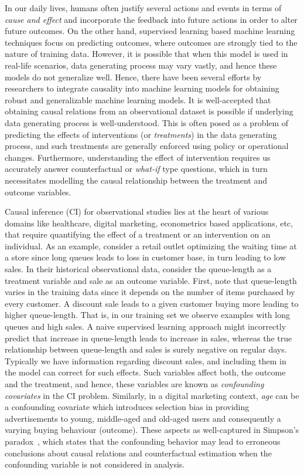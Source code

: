 \documentclass[twoside,11pt]{article}
\begin{document}
In our daily lives, humans often justify several actions and events in terms of \emph{cause and effect} and incorporate the feedback into future actions in order to alter future outcomes. On the other hand, supervised learning based machine learning techniques focus on predicting outcomes, where outcomes are strongly tied to the nature of training data. However, it is possible that when this model is used in real-life scenarios, data generating process may vary vastly, and hence these models do not generalize well. Hence, there have been several efforts by researchers to integrate causality into machine learning models for obtaining robust and generalizable machine learning models. It is well-accepted that obtaining causal relations from an observational dataset is possible if underlying data generating process is well-understood. This is often posed as a problem of predicting the effects of interventions (or \emph{treatments}) in the data generating process, and such treatments are generally enforced using policy or operational changes. Furthermore, understanding the effect of intervention requires us accurately answer counterfactual or \emph{what-if} type questions, which in turn necessitates modelling the  causal relationship between the treatment and outcome variables.

Causal inference (CI) for observational studies lies at the heart of various domains like healthcare, digital marketing, econometrics based applications, etc, that require quantifying the effect of a treatment or an intervention on an individual. As an example, consider a retail outlet optimizing the waiting time at a store since long queues leads to loss in customer base, in turn leading to low sales. In their historical observational data, consider the queue-length as a treatment variable and sale as an outcome variable. First, note that queue-length varies in the training data since it depends on the number of items purchased by every customer. A discount sale leads to a given customer buying more leading to higher queue-length. That is, in our training set we observe examples with long queues and high sales. A naive supervised learning approach might incorrectly predict that increase in queue-length leads to increase in sales, whereas the true relationship between queue-length and sales is surely negative on regular days. Typically we have information regarding discount sales, and including them in the model can correct for such effects. Such variables affect both, the outcome and the treatment, and hence, these variables are known as \emph{confounding covariates} in the CI problem. Similarly, in a digital marketing context, \emph{age} can be a confounding covariate which introduces selection bias in providing advertisements to young, middle-aged and old-aged users and consequently a varying buying behaviour (outcome). These aspects as well-captured in Simpson's paradox~\citep{bottou2013counterfactual}, which states that the confounding behavior may lead to erroneous conclusions about causal relations and counterfactual estimation when the confounding variable is not considered in analysis. 
\end{document}
